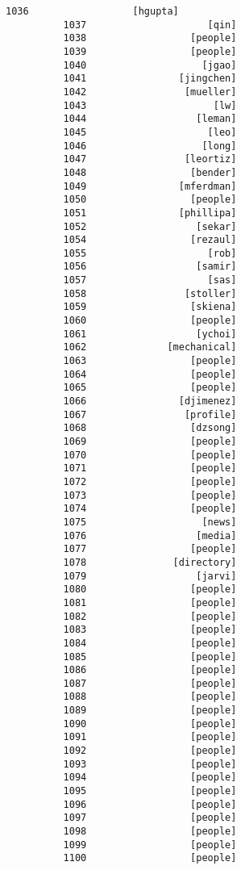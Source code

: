 \documentclass[11pt]{article}
\begin{document}
\begin{Verbatim}[commandchars=\\\{\}]
          1036                  [hgupta]
          1037                     [qin]
          1038                  [people]
          1039                  [people]
          1040                    [jgao]
          1041                [jingchen]
          1042                 [mueller]
          1043                      [lw]
          1044                   [leman]
          1045                     [leo]
          1046                    [long]
          1047                 [leortiz]
          1048                  [bender]
          1049                [mferdman]
          1050                  [people]
          1051                [phillipa]
          1052                   [sekar]
          1054                  [rezaul]
          1055                     [rob]
          1056                   [samir]
          1057                     [sas]
          1058                 [stoller]
          1059                  [skiena]
          1060                  [people]
          1061                   [ychoi]
          1062              [mechanical]
          1063                  [people]
          1064                  [people]
          1065                  [people]
          1066                [djimenez]
          1067                 [profile]
          1068                  [dzsong]
          1069                  [people]
          1070                  [people]
          1071                  [people]
          1072                  [people]
          1073                  [people]
          1074                  [people]
          1075                    [news]
          1076                   [media]
          1077                  [people]
          1078               [directory]
          1079                   [jarvi]
          1080                  [people]
          1081                  [people]
          1082                  [people]
          1083                  [people]
          1084                  [people]
          1085                  [people]
          1086                  [people]
          1087                  [people]
          1088                  [people]
          1089                  [people]
          1090                  [people]
          1091                  [people]
          1092                  [people]
          1093                  [people]
          1094                  [people]
          1095                  [people]
          1096                  [people]
          1097                  [people]
          1098                  [people]
          1099                  [people]
          1100                  [people]

\end{Verbatim}
\end{document}
